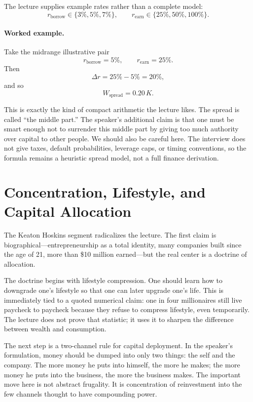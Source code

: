 The lecture supplies example rates rather than a complete model:
\[
r_{\text{borrow}} \in \{3\%,5\%,7\%\},\qquad
r_{\text{earn}} \in \{25\%,50\%,100\%\}.
\]

\paragraph{Worked example.}
Take the midrange illustrative pair
\[
r_{\text{borrow}} = 5\%,\qquad r_{\text{earn}} = 25\%.
\]
Then
\[
\Delta r = 25\% - 5\% = 20\%,
\]
and so
\[
W_{\text{spread}} = 0.20\,K.
\]

This is exactly the kind of compact arithmetic the lecture likes. The spread is called ``the middle part.'' The speaker's additional claim is that one must be smart enough not to surrender this middle part by giving too much authority over capital to other people. We should also be careful here. The interview does not give taxes, default probabilities, leverage caps, or timing conventions, so the formula remains a heuristic spread model, not a full finance derivation.

\section{Concentration, Lifestyle, and Capital Allocation}

The Keaton Hoskins segment radicalizes the lecture. The first claim is biographical---entrepreneurship as a total identity, many companies built since the age of 21, more than \$10 million earned---but the real center is a doctrine of allocation.

The doctrine begins with lifestyle compression. One should learn how to downgrade one's lifestyle so that one can later upgrade one's life. This is immediately tied to a quoted numerical claim: one in four millionaires still live paycheck to paycheck because they refuse to compress lifestyle, even temporarily. The lecture does not prove that statistic; it uses it to sharpen the difference between wealth and consumption.

The next step is a two-channel rule for capital deployment. In the speaker's formulation, money should be dumped into only two things: the self and the company. The more money he puts into himself, the more he makes; the more money he puts into the business, the more the business makes. The important move here is not abstract frugality. It is concentration of reinvestment into the few channels thought to have compounding power.

